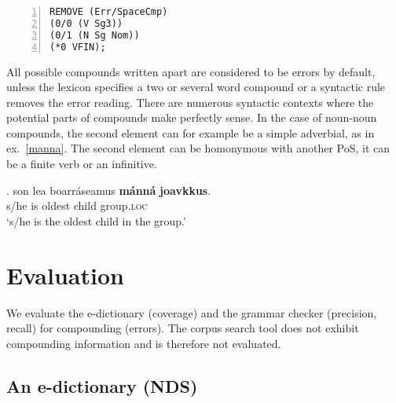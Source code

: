 \documentclass[free]{flammie}
\begin{document}
\begin{Verbatim}[frame=single,framerule=0.2mm,framesep=3mm,fontsize=\footnotesize,baselinestretch=1,numbers=left]
REMOVE (Err/SpaceCmp)
(0/0 (V Sg3))
(0/1 (N Sg Nom))
(*0 VFIN);
\end{Verbatim}


All possible compounds written apart are considered
to be errors by default, unless the lexicon specifies a two or
several word compound %
or a syntactic rule removes the error reading.
There are numerous syntactic contexts where the potential parts of
compounds make perfectly sense.
In the case of noun-noun compounds, the second element can for example be a simple adverbial,
as in ex.~\ref{manna}. %
The second element can be homonymous with another PoS, it can be a finite verb or an infinitive.


\exg. son lea boarráseamus \textbf{mánná} \textbf{joavkkus}.\label{manna}\\
s/he is oldest child group\textsc{.loc}\\
`s/he is the oldest child in the group.'



\section{Evaluation}

We evaluate the e-dictionary (coverage) and the grammar checker (precision, recall) for compounding (errors). The corpus search tool does not exhibit compounding information and is therefore not evaluated.


\subsection{An e-dictionary (NDS)}
\end{document}
